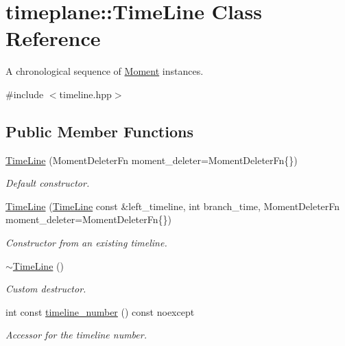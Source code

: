 \hypertarget{classtimeplane_1_1_time_line}{}\section{timeplane\+:\+:Time\+Line Class Reference}
\label{classtimeplane_1_1_time_line}


A chronological sequence of {\ttfamily \hyperlink{classtimeplane_1_1_moment}{Moment}} instances.  




{\ttfamily \#include $<$timeline.\+hpp$>$}

\subsection*{Public Member Functions}
\begin{DoxyCompactItemize}
\item 
\hyperlink{classtimeplane_1_1_time_line_a1f23d03d9ca5799fc641ffbc29a5f32d}{Time\+Line} (Moment\+Deleter\+Fn moment\+\_\+deleter=Moment\+Deleter\+Fn\{\})
\begin{DoxyCompactList}\small\item\em Default constructor. \end{DoxyCompactList}\item 
\hyperlink{classtimeplane_1_1_time_line_a914a02e64e4bbc4bb4840012368c03f3}{Time\+Line} (\hyperlink{classtimeplane_1_1_time_line}{Time\+Line} const \&left\+\_\+timeline, int branch\+\_\+time, Moment\+Deleter\+Fn moment\+\_\+deleter=Moment\+Deleter\+Fn\{\})
\begin{DoxyCompactList}\small\item\em Constructor from an existing timeline. \end{DoxyCompactList}\item 
\hyperlink{classtimeplane_1_1_time_line_a2d16c3db644a5e8dc4c0f12622c6a4e6}{$\sim$\+Time\+Line} ()
\begin{DoxyCompactList}\small\item\em Custom destructor. \end{DoxyCompactList}\item 
int const \hyperlink{classtimeplane_1_1_time_line_a4297da8acc6fbee73bfc7db0de2f80a5}{timeline\+\_\+number} () const noexcept
\begin{DoxyCompactList}\small\item\em Accessor for the timeline number. \end{DoxyCompactList}\item 

\end{DoxyCompactItemize}
